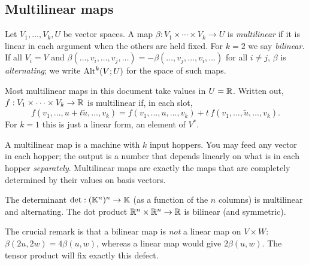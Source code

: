 \subsection{Multilinear maps}\label{sec:multilinear}
\begin{definition}
Let $V_1,\dots,V_k,U$ be vector spaces. A map $\beta:V_1\times\cdots\times V_k\to U$ is
\emph{multilinear} if it is linear in each argument when the others are held fixed.
For $k=2$ we say \emph{bilinear}. If all $V_i=V$ and
$\beta(\dots,v_i,\dots,v_j,\dots)=-\beta(\dots,v_j,\dots,v_i,\dots)$ for all $i\neq j$,
$\beta$ is \emph{alternating}; we write $\mathrm{Alt}^k(V;U)$ for the space of such maps.
\end{definition}

\begin{formal}
Most multilinear maps in this document take values in $U=\mathbb{R}$. Written out, $f:V_1\times\dots\times V_k\to\mathbb{R}$ is multilinear if, in each slot,
\[
f(v_1,\dots,u+t\tilde u,\dots,v_k)=f(v_1,\dots,u,\dots,v_k)+t\,f(v_1,\dots,\tilde u,\dots,v_k).
\]
For $k=1$ this is just a linear form, an element of $V^*$.
\end{formal}

\begin{intuition}[{linear in every slot = ``a machine with several input slots''}]
A multilinear map is a machine with $k$ input hoppers. You may feed any vector in each hopper; the output is a number that depends linearly on what is in each hopper \emph{separately}. Multilinear maps are exactly the maps that are completely determined by their values on basis vectors.
\end{intuition}

\begin{example}
The determinant $\det:(\mathbb{K}^n)^n\to\mathbb{K}$ (as a function of the $n$ columns) is multilinear and alternating.
The dot product $\mathbb{R}^n\times\mathbb{R}^n\to\mathbb{R}$ is bilinear (and symmetric).
\end{example}

The crucial remark is that a bilinear map is \emph{not} a linear map on $V\times W$:
$\beta(2u,2w)=4\beta(u,w)$, whereas a linear map would give $2\beta(u,w)$. The tensor product
will fix exactly this defect.
